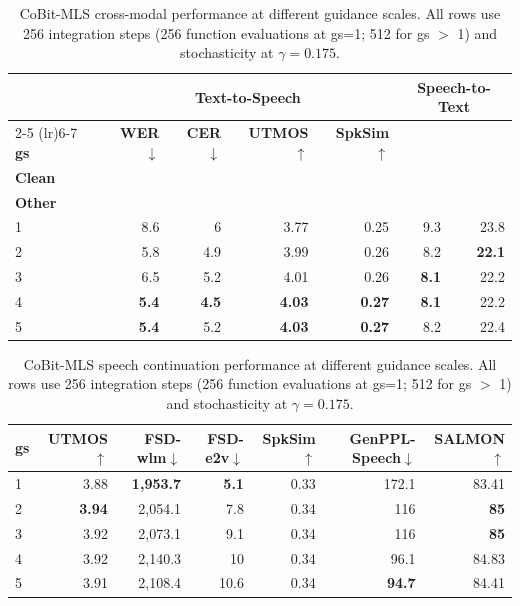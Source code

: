 \begin{table}[t]
\centering
\small
\setlength{\tabcolsep}{4.5pt}
\begin{tabular}{lrrrrrr}
\toprule
& \multicolumn{4}{c}{\textbf{Text-to-Speech}} & \multicolumn{2}{c}{\textbf{Speech-to-Text}} \\
\cmidrule(lr){2-5} \cmidrule(lr){6-7}
\textbf{gs} & \textbf{WER}$\downarrow$ & \textbf{CER}$\downarrow$ & \textbf{UTMOS}$\uparrow$ & \textbf{SpkSim}$\uparrow$ & \makecell{\textbf{WER}$\downarrow$ \\ \textbf{Clean}} & \makecell{\textbf{WER}$\downarrow$ \\ \textbf{Other}} \\
\midrule
1 & 8.6 & 6 & 3.77 & 0.25 & 9.3 & 23.8\\ 
2 & 5.8 & 4.9 & 3.99 & 0.26 & 8.2 & \textbf{22.1} \\
3 & 6.5 & 5.2 & 4.01 & 0.26 & \textbf{8.1} & 22.2 \\
4 & \textbf{5.4} & \textbf{4.5} & \textbf{4.03} & \textbf{0.27} & \textbf{8.1} & 22.2\\
5 & \textbf{5.4} & 5.2 & \textbf{4.03} & \textbf{0.27} & 8.2 & 22.4 \\
\bottomrule
\end{tabular}
\caption{CoBit-MLS cross-modal performance at different guidance scales. All rows use 256 integration steps (256 function evaluations at gs=1; 512 for gs $>$ 1) and stochasticity at $\gamma=0.175$.}
\label{tab:audio:guidance:cross-modal}
\end{table}

\begin{table}[t]
\centering
\small
\setlength{\tabcolsep}{4.5pt}
\begin{tabular}{lrrrrrr}
\toprule
\textbf{gs} & \textbf{UTMOS}$\uparrow$ & \textbf{FSD-wlm}$\downarrow$ & \textbf{FSD-e2v}$\downarrow$ & \textbf{SpkSim}$\uparrow$ & \textbf{GenPPL-Speech}$\downarrow$ & \textbf{SALMON}$\uparrow$ \\
\midrule
1 & 3.88 & \textbf{1{,}953.7} & \textbf{5.1} & 0.33 & 172.1 & 83.41 \\
2 & \textbf{3.94} & 2{,}054.1 & 7.8 & 0.34 & 116 & \textbf{85} \\ 
3 & 3.92 & 2{,}073.1 & 9.1 & 0.34 & 116 & \textbf{85} \\
4 & 3.92 & 2{,}140.3 & 10 & 0.34 & 96.1 & 84.83 \\ 
5 & 3.91 & 2{,}108.4 & 10.6 & 0.34 & \textbf{94.7} & 84.41 \\
\bottomrule
\end{tabular}
\caption{CoBit-MLS speech continuation performance at different guidance scales. All rows use 256 integration steps (256 function evaluations at gs=1; 512 for gs $>$ 1) and stochasticity at $\gamma=0.175$.}
\label{tab:audio:guidance:continuation}
\end{table}

